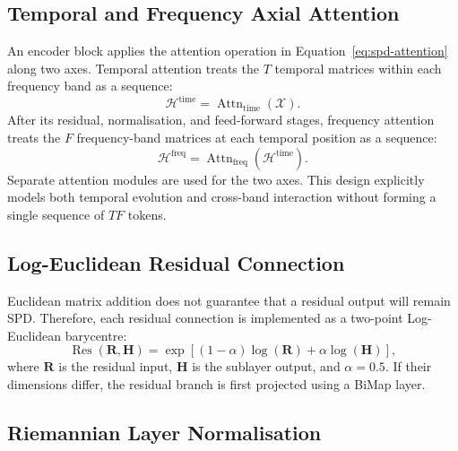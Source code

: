 \subsection{Temporal and Frequency Axial Attention}

An encoder block applies the attention operation in
Equation~\eqref{eq:spd-attention} along two axes. Temporal attention treats the
$T$ temporal matrices within each frequency band as a sequence:
\begin{equation}
    \bm{\mathcal{H}}^{\mathrm{time}}
    =
    \operatorname{Attn}_{\mathrm{time}}
    (\bm{\mathcal{X}}).
\end{equation}
After its residual, normalisation, and feed-forward stages, frequency attention
treats the $F$ frequency-band matrices at each temporal position as a sequence:
\begin{equation}
    \bm{\mathcal{H}}^{\mathrm{freq}}
    =
    \operatorname{Attn}_{\mathrm{freq}}
    (\bm{\mathcal{H}}^{\mathrm{time}}).
\end{equation}
Separate attention modules are used for the two axes. This design explicitly
models both temporal evolution and cross-band interaction without forming a
single sequence of $TF$ tokens.

\subsection{Log-Euclidean Residual Connection}

Euclidean matrix addition does not guarantee that a residual output will remain
SPD. Therefore, each residual connection is implemented as a two-point
Log-Euclidean barycentre:
\begin{equation}
    \operatorname{Res}(\bm{R},\bm{H})
    =
    \exp\left[
        (1-\alpha)\log(\bm{R})
        +\alpha\log(\bm{H})
    \right],
    \label{eq:spd-residual}
\end{equation}
where $\bm{R}$ is the residual input, $\bm{H}$ is the sublayer output, and
$\alpha=0.5$. If their dimensions differ, the residual branch is first
projected using a BiMap layer.

\subsection{Riemannian Layer Normalisation}

